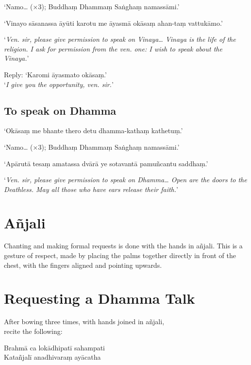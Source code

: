 ‘Namo… (×3); Buddhaṃ Dhammaṃ Saṅghaṃ namassāmi.’

‘Vinayo sāsanassa āyūti karotu me āyasmā okāsaṃ ahan-taṃ vattukāmo.’

‘\emph{Ven. sir, please give permission to speak on Vinaya… Vinaya is the life
  of the religion. I ask for permission from the ven. one: I wish to speak about
  the Vinaya.}’

Reply: ‘Karomi āyasmato okāsaṃ.’\\
‘\emph{I give you the opportunity, ven. sir.}’ 

\clearpage

\subsection{To speak on Dhamma}


‘Okāsaṃ me bhante thero detu dhamma-kathaṃ kathetuṃ.’

‘Namo… (×3); Buddhaṃ Dhammaṃ Saṅghaṃ namassāmi.’

‘Apārutā tesaṃ amatassa dvārā ye sotavantā pamuñcantu saddhaṃ.’

‘\emph{Ven. sir, please give permission to speak on Dhamma… Open are the doors
  to the Deathless. May all those who have ears release their faith.}’

\section{Añjali}

Chanting and making formal requests is done with the hands in añjali.
This is a gesture of respect, made by placing the palms together
directly in front of the chest, with the fingers aligned and pointing
upwards.

\section{Requesting a Dhamma Talk}

\begin{instruction}
  After bowing three times, with hands joined in añjali,\\
  recite the following:
\end{instruction}

Brahmā ca lokādhipatī sahampati\\
Katañjalī anadhivaraṃ ayācatha

